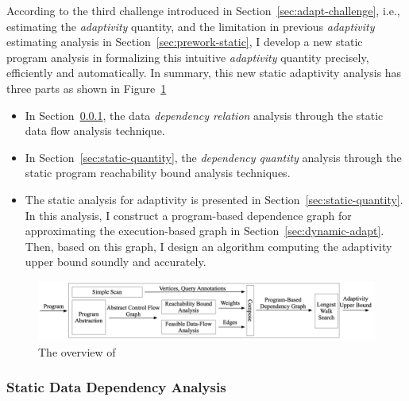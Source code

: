 According to the third challenge introduced in Section~\ref{sec:adapt-challenge},
i.e., estimating the \emph{adaptivity} quantity,
and the limitation in previous \emph{adaptivity} estimating analysis in Section~\ref{sec:prework-static},
I develop a new static program analysis in formalizing this intuitive \emph{adaptivity} quantity
precisely, efficiently and automatically.
In summary, this new static adaptivity analysis has three parts as shown in Figure~\ref{fig:adaptfun}
\begin{itemize}
    \item In Section~\ref{sec:static-datadep},
    the data \emph{dependency relation} analysis through the static data flow analysis technique.
    \item In Section~\ref{sec:static-quantity}, the \emph{dependency quantity} analysis through the static program reachability bound analysis techniques.
    \item The static analysis for adaptivity is presented in Section~\ref{sec:static-quantity}.
    In this analysis, I construct a program-based dependence graph for approximating the execution-based graph in Section~\ref{sec:dynamic-adapt}.
    Then, based on this graph, I design an algorithm
    computing the adaptivity upper bound soundly 
    and accurately.
    \end{itemize}

    \begin{figure}
      \centering    
    \includegraphics[width=1.0\columnwidth]{figures/adapfun.png}
      \vspace{-0.3cm}
      \caption{The overview of {\THESYSTEM}}
      \label{fig:adaptfun}
      \vspace{-0.5cm}
    \end{figure}
    
\subsubsection{Static Data Dependency Analysis}
\label{sec:static-datadep}


